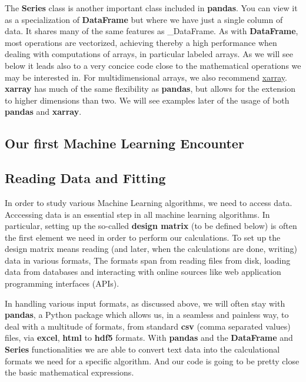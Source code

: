 \documentclass[%
oneside,                 %
final,                   %
10pt]{article}
\begin{document}
The \textbf{Series} class is another important class included in
\textbf{pandas}. You can view it as a specialization of \textbf{DataFrame} but where
we have just a single column of data. It shares many of the same features as _DataFrame. As with \textbf{DataFrame},
most operations are vectorized, achieving thereby a high performance when dealing with computations of arrays, in particular labeled arrays.
As we will see below it leads also to a very concice code close to the mathematical operations we may be interested in.
For multidimensional arrays, we also recommend \href{{http://xarray.pydata.org/en/stable/}}{xarray}. \textbf{xarray} has much of the same flexibility as \textbf{pandas}, but allows for the extension to higher dimensions than two. We will see examples later of the usage of both \textbf{pandas} and \textbf{xarray}. 




\subsection*{Our first Machine Learning Encounter}

\subsection*{Reading Data and Fitting}

In order to study various Machine Learning algorithms, we need to
access data. Acccessing data is an essential step in all machine
learning algorithms. In particular, setting up the so-called \textbf{design
matrix} (to be defined below) is often the first element we need in
order to perform our calculations. To set up the design matrix means
reading (and later, when the calculations are done, writing) data
in various formats, The formats span from reading files from disk,
loading data from databases and interacting with online sources
like web application programming interfaces (APIs).

In handling various input formats, as discussed above, we will often stay with \textbf{pandas},
a Python package which allows us, in a seamless and painless way, to
deal with a multitude of formats, from standard \textbf{csv} (comma separated
values) files, via \textbf{excel}, \textbf{html} to \textbf{hdf5} formats.  With \textbf{pandas}
and the \textbf{DataFrame}  and \textbf{Series} functionalities we are able to convert text data
into the calculational formats we need for a specific algorithm. And our code is going to be 
pretty close the basic mathematical expressions.
\end{document}
